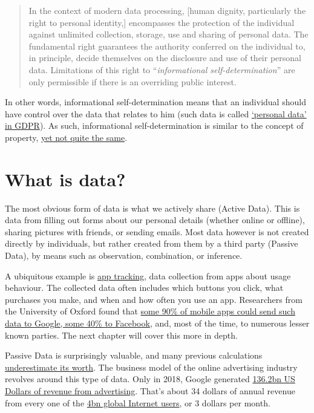 \documentclass[
]{book}
\begin{document}
\begin{quote}
In the context of modern data processing, {[}human dignity, particularly the right to personal identity,{]} encompasses the protection of the individual against unlimited collection, storage, use and sharing of personal data. The fundamental right guarantees the authority conferred on the individual to, in principle, decide themselves on the disclosure and use of their personal data. Limitations of this right to ``\emph{informational self-determination}'' are only permissible if there is an overriding public interest.
\end{quote}

In other words, informational self-determination means that an individual should have control over the data that relates to him (such data is called \href{https://gdpr-info.eu/art-4-gdpr/}{`personal data' in GDPR}). As such, informational self-determination is similar to the concept of property, \href{https://leidenlawblog.nl/articles/privacy-and-property-do-you-really-own-your-personal-data}{yet not quite the same}.

\hypertarget{what-is-data}{%
\section{What is data?}\label{what-is-data}}

The most obvious form of data is what we actively share (Active Data). This is data from filling out forms about our personal details (whether online or offline), sharing pictures with friends, or sending emails. Most data however is not created directly by individuals, but rather created from them by a third party (Passive Data), by means such as observation, combination, or inference.

A ubiquitous example is \href{https://en.ryte.com/wiki/App_Tracking}{app tracking}, data collection from apps about usage behaviour. The collected data often includes which buttons you click, what purchases you make, and when and how often you use an app. Researchers from the University of Oxford found that \href{https://arxiv.org/pdf/1804.03603.pdf}{some 90\% of mobile apps could send such data to Google, some 40\% to Facebook}, and, most of the time, to numerous lesser known parties. The next chapter will cover this more in depth.

Passive Data is surprisingly valuable, and many previous calculations \href{https://ig.ft.com/how-much-is-your-personal-data-worth/}{underestimate its worth}. The business model of the online advertising industry revolves around this type of data. Only in 2018, Google generated \href{https://www.statista.com/statistics/266249/advertising-revenue-of-google/}{136.2bn US Dollars of revenue from advertising}. That's about 34 dollars of annual revenue from every one of the \href{https://wearesocial.com/blog/2018/01/global-digital-report-2018}{4bn global Internet users}, or 3 dollars per month.
\end{document}

